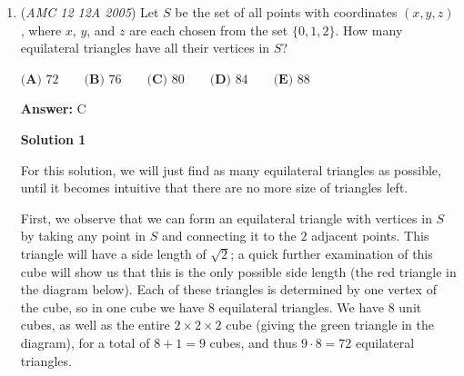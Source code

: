 \begin{enumerate}
 If we now guess that $Q(x)$ is a quadratic polynomial, it follows that e.g. $\left(Q(x)-1\right)$ must be equal to a product of $2$ factors from the expression $\left(x-1\right)\left(x-2\right)\left(x-3\right)\left(x-r_1\right)\left(x-r_2\right)\left(x-r_3\right)$. As this expression contains $6$ factors in total, the number of ways of choosing $2$ factors from it, where the order matters, would be $6!/4! = 30$.

 While none of the answer choices are $30$, we can now eliminate $\mathrm {(E) }$ as $32 > 30$. Looking for answers that are similar, we further observe that $22$, $27$, or $32$ would have been derived from a $27$ in the actual solution, to which $5$ was possibly added or subtracted. We can therefore guess, if sufficiently desperate, that the answer should be either $\mathrm {(B) } \ 22$ or $\mathrm {(D) } \ 27$.

 On the other hand, if you're desperate for time, it's probably a better idea to go back and review Problems $1$ to $20$, rather than guessing on Problem $24$!

 


	\item (\textit{AMC 12 12A 2005}) Let $S$ be the set of all points with coordinates $(x,y,z)$, where $x$, $y$, and $z$ are each chosen from the set $\{0, 1, 2\}$. How many equilateral triangles have all their vertices in $S$?


 $\textbf{(A) } 72 \qquad \textbf{(B) } 76 \qquad \textbf{(C) } 80 \qquad \textbf{(D) } 84 \qquad \textbf{(E) } 88$

 \textbf{Answer: }C



\textbf{Solution 1}

For this solution, we will just find as many equilateral triangles as possible, until it becomes intuitive that there are no more size of triangles left.

 First, we observe that we can form an equilateral triangle with vertices in $S$ by taking any point in $S$ and connecting it to the $2$ adjacent points. This triangle will have a side length of $\sqrt{2}$; a quick further examination of this cube will show us that this is the only possible side length (the red triangle in the diagram below). Each of these triangles is determined by one vertex of the cube, so in one cube we have $8$ equilateral triangles. We have $8$ unit cubes, as well as the entire $2 \times 2 \times 2$ cube (giving the green triangle in the diagram), for a total of $8+1 = 9$ cubes, and thus $9 \cdot 8 = 72$ equilateral triangles. 


\end{enumerate}
